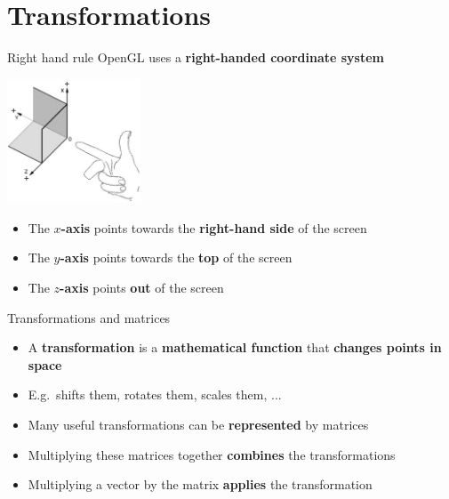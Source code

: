 \part{Transformations}
\frame{\partpage}

\begin{frame}{Right hand rule}
	\pause OpenGL uses a \textbf{right-handed coordinate system}
	\pause \begin{center}
		\includegraphics[width=0.3\textwidth]{RightHandRule}
	\end{center}
	\begin{itemize}
		\pause\item The \textbf{$x$-axis} points towards the \textbf{right-hand side} of the screen
		\pause\item The \textbf{$y$-axis} points towards the \textbf{top} of the screen
		\pause\item The \textbf{$z$-axis} points \textbf{out} of the screen
	\end{itemize}
\end{frame}

\begin{frame}{Transformations and matrices}
	\begin{itemize}
		\pause\item A \textbf{transformation} is a \textbf{mathematical function} that \textbf{changes points in space}
		\pause\item E.g.\ shifts them, rotates them, scales them, ...
		\pause\item Many useful transformations can be \textbf{represented} by matrices
		\pause\item Multiplying these matrices together \textbf{combines} the transformations
		\pause\item Multiplying a vector by the matrix \textbf{applies} the transformation
	\end{itemize}
\end{frame}

